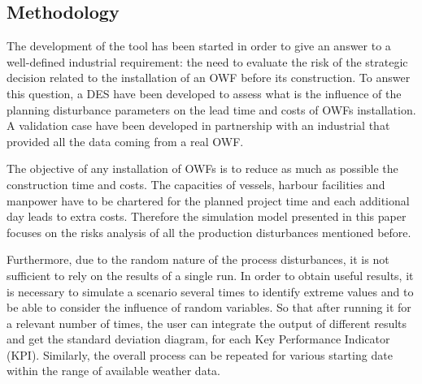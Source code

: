 \subsection{Methodology}
The development of the tool has been started in order to give an answer to a well-defined industrial requirement: the need to evaluate the risk of the strategic decision related to the installation of an OWF before its construction. To answer this question, a DES have been developed to assess what is the influence of the planning disturbance parameters on the lead time and costs of OWFs installation. A validation case have been developed in partnership with an industrial that provided all the data coming from a real OWF.

The objective of any installation of OWFs is to reduce as much as possible the construction time and costs. The capacities of vessels, harbour facilities and manpower have to be chartered for the planned project time and each additional day leads to extra costs. Therefore the simulation model presented in this paper focuses on the risks analysis of all the production disturbances mentioned before.


Furthermore, due to the random nature of the process disturbances, it is not sufficient to rely on the results of a single run. In order to obtain useful results, it is necessary to simulate a scenario several times to identify extreme values and to be able to consider the influence of random variables. So that after running it for a relevant number of times, the user can integrate the output of different results and get the standard deviation diagram, for each Key Performance Indicator (KPI). Similarly, the overall process can be repeated for various starting date within the range of available weather data.

